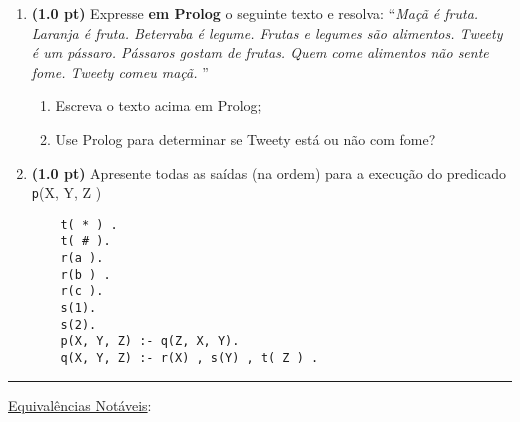 \documentclass[11pt, a4paper,final]{article}
\begin{document}
\begin{enumerate}
\item {\bf (1.0 pt)} Expresse {\bf em Prolog} o seguinte texto e resolva: 
``\textit{Maçã é fruta. Laranja é fruta. Beterraba é legume. Frutas e legumes são alimentos. Tweety é um pássaro. Pássaros gostam de frutas. Quem come alimentos não sente fome. Tweety comeu maçã. }''

\begin{enumerate}
  \item Escreva o texto acima em Prolog;
  \item Use Prolog para determinar se Tweety está ou não com fome?
\end{enumerate}

\item {\bf (1.0 pt)} Apresente todas as saídas (na ordem) para a execução do predicado {\texttt p(X, Y, Z )}

\begin{verbatim}
	t( * ) .
	t( # ).
	r(a ).
	r(b ) .
	r(c ).
	s(1).
	s(2).
	p(X, Y, Z) :- q(Z, X, Y).
	q(X, Y, Z) :- r(X) , s(Y) , t( Z ) .
\end{verbatim}



\end{enumerate}


\noindent\rule{0.8\textwidth}{2pt}



\underline{{\large Equivalências Notáveis}}:
\end{document}

